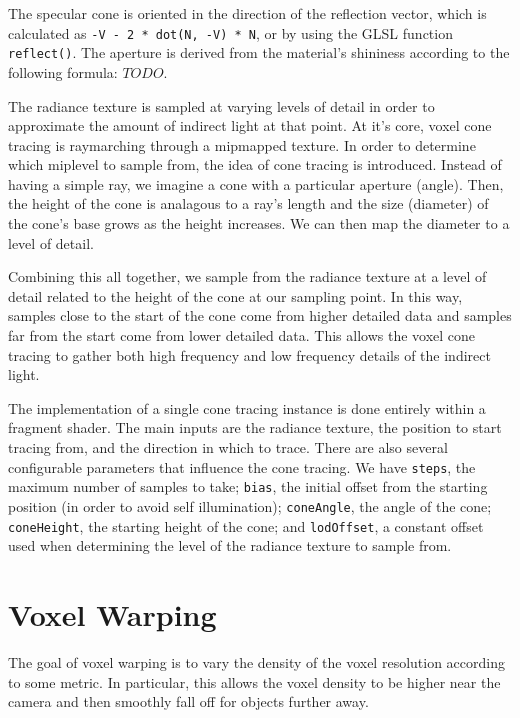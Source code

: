 The specular cone is oriented in the direction of the reflection vector, which is calculated as \texttt{-V - 2 * dot(N, -V) * N}, or by using the GLSL function \texttt{reflect()}. The aperture is derived from the material's shininess according to the following formula: $TODO$.

The radiance texture is sampled at varying levels of detail in order to approximate the amount of indirect light at that point. At it's core, voxel cone tracing is raymarching through a mipmapped texture. In order to determine which miplevel to sample from, the idea of cone tracing is introduced. Instead of having a simple ray, we imagine a cone with a particular aperture (angle). Then, the height of the cone is analagous to a ray's length and the size (diameter) of the cone's base grows as the height increases. We can then map the diameter to a level of detail.

Combining this all together, we sample from the radiance texture at a level of detail related to the height of the cone at our sampling point. In this way, samples close to the start of the cone come from higher detailed data and samples far from the start come from lower detailed data. This allows the voxel cone tracing to gather both high frequency and low frequency details of the indirect light.

The implementation of a single cone tracing instance is done entirely within a fragment shader. The main inputs are the radiance texture, the position to start tracing from, and the direction in which to trace. There are also several configurable parameters that influence the cone tracing. We have \texttt{steps}, the maximum number of samples to take; \texttt{bias}, the initial offset from the starting position (in order to avoid self illumination); \texttt{coneAngle}, the angle of the cone; \texttt{coneHeight}, the starting height of the cone; and \texttt{lodOffset}, a constant offset used when determining the level of the radiance texture to sample from. %

\section{Voxel Warping}
The goal of voxel warping is to vary the density of the voxel resolution according to some metric. In particular, this allows the voxel density to be higher near the camera and then smoothly fall off for objects further away.


